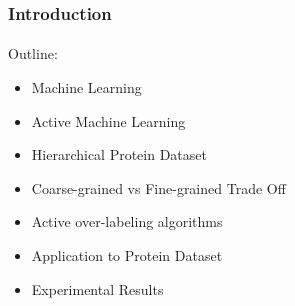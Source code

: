 \documentclass{beamer}
\begin{document}
\begin{frame}
    \frametitle{Introduction}    %
    \framesubtitle{}
\par Outline:
\begin{itemize}
  \item Machine Learning
  \item Active Machine Learning
  \item Hierarchical Protein Dataset
  \item Coarse-grained vs Fine-grained Trade Off
  \item Active over-labeling algorithms
  \item Application to Protein Dataset
  \item Experimental Results
\end{itemize}
\end{frame}
\end{document}
